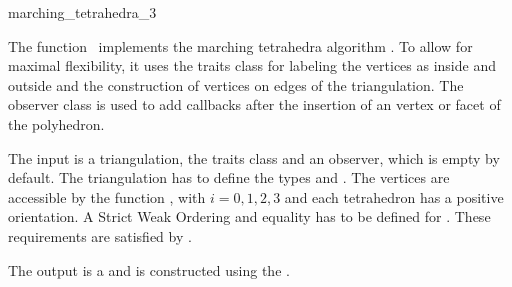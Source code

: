 

\begin{ccRefFunction}{marching_tetrahedra_3}

\ccDefinition

The function \ccRefName\ implements the marching tetrahedra algorithm
\cite{cgal:tpg-rmtiise-99}. To allow for maximal flexibility, it uses
the traits class  for labeling the
vertices as inside and outside and the construction of vertices on
edges of the triangulation. The observer class
 is used to add callbacks after the
insertion of an vertex or facet of the polyhedron.

The input is a triangulation, the traits class and an observer, which
is empty by default. The triangulation has to define the types
 and . The vertices are
accessible by the function , with $i=0,1,2,3$ and each
tetrahedron has a positive orientation. A Strict Weak Ordering and
equality has to be defined for . These requirements
are satisfied by .

The output is a  and is constructed using the
.



\ccSeeAlso
{}\\
\\
\\

\end{ccRefFunction}


